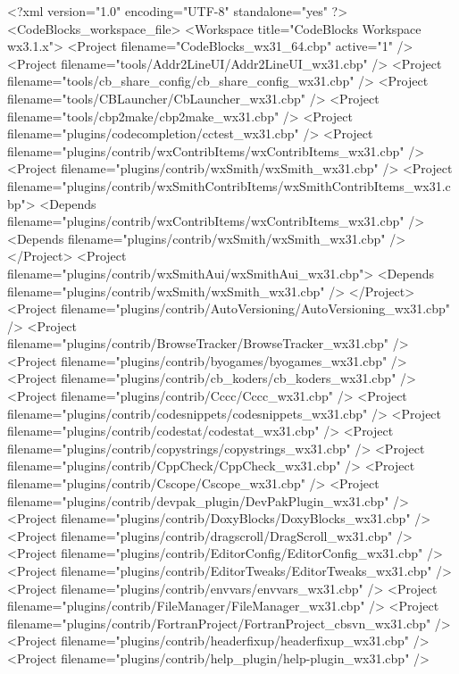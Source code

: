 \begin{code}
<?xml version="1.0" encoding="UTF-8" standalone="yes" ?>
<CodeBlocks_workspace_file>
  <Workspace title="CodeBlocks Workspace wx3.1.x">
    <Project filename="CodeBlocks_wx31_64.cbp" active="1" />
    <Project filename="tools/Addr2LineUI/Addr2LineUI_wx31.cbp" />
    <Project filename="tools/cb_share_config/cb_share_config_wx31.cbp" />
    <Project filename="tools/CBLauncher/CbLauncher_wx31.cbp" />
    <Project filename="tools/cbp2make/cbp2make_wx31.cbp" />
    <Project filename="plugins/codecompletion/cctest_wx31.cbp" />
    <Project filename="plugins/contrib/wxContribItems/wxContribItems_wx31.cbp" />
    <Project filename="plugins/contrib/wxSmith/wxSmith_wx31.cbp" />
    <Project filename="plugins/contrib/wxSmithContribItems/wxSmithContribItems_wx31.cbp">
      <Depends filename="plugins/contrib/wxContribItems/wxContribItems_wx31.cbp" />
      <Depends filename="plugins/contrib/wxSmith/wxSmith_wx31.cbp" />
    </Project>
    <Project filename="plugins/contrib/wxSmithAui/wxSmithAui_wx31.cbp">
      <Depends filename="plugins/contrib/wxSmith/wxSmith_wx31.cbp" />
    </Project>
    <Project filename="plugins/contrib/AutoVersioning/AutoVersioning_wx31.cbp" />
    <Project filename="plugins/contrib/BrowseTracker/BrowseTracker_wx31.cbp" />
    <Project filename="plugins/contrib/byogames/byogames_wx31.cbp" />
    <Project filename="plugins/contrib/cb_koders/cb_koders_wx31.cbp" />
    <Project filename="plugins/contrib/Cccc/Cccc_wx31.cbp" />
    <Project filename="plugins/contrib/codesnippets/codesnippets_wx31.cbp" />
    <Project filename="plugins/contrib/codestat/codestat_wx31.cbp" />
    <Project filename="plugins/contrib/copystrings/copystrings_wx31.cbp" />
    <Project filename="plugins/contrib/CppCheck/CppCheck_wx31.cbp" />
    <Project filename="plugins/contrib/Cscope/Cscope_wx31.cbp" />
    <Project filename="plugins/contrib/devpak_plugin/DevPakPlugin_wx31.cbp" />
    <Project filename="plugins/contrib/DoxyBlocks/DoxyBlocks_wx31.cbp" />
    <Project filename="plugins/contrib/dragscroll/DragScroll_wx31.cbp" />
    <Project filename="plugins/contrib/EditorConfig/EditorConfig_wx31.cbp" />
    <Project filename="plugins/contrib/EditorTweaks/EditorTweaks_wx31.cbp" />
    <Project filename="plugins/contrib/envvars/envvars_wx31.cbp" />
    <Project filename="plugins/contrib/FileManager/FileManager_wx31.cbp" />
    <Project filename="plugins/contrib/FortranProject/FortranProject_cbsvn_wx31.cbp" />
    <Project filename="plugins/contrib/headerfixup/headerfixup_wx31.cbp" />
    <Project filename="plugins/contrib/help_plugin/help-plugin_wx31.cbp" />

\end{code}
